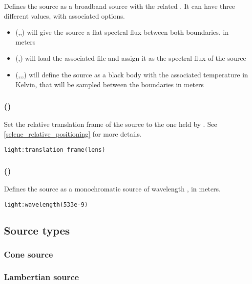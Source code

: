 Defines the source as a broadband source with the related . It can have three different values, with associated options.
\begin{itemize}
	\item {}(,,) will give the source a flat spectral flux between both boundaries, in meters
	\item {}(,) will load the associated file and assign it as the spectral flux of the source
	\item {}(,,,) will define the source as a black body with the associated temperature in Kelvin, that will be sampled between the boundaries in meters
\end{itemize}

\subsubsection[translation\_frame]{()}

Set the relative translation frame of the source to the one held by . See \ref{selene_relative_positioning} for more details.
\begin{lstlisting}
light:translation_frame(lens)
\end{lstlisting}

\subsubsection[wavelength]{()}

Defines the source as a monochromatic source of wavelength , in meters.
\begin{lstlisting}
light:wavelength(533e-9)
\end{lstlisting}

\subsection{Source types}

\subsubsection{Cone source}

\subsubsection{Lambertian source}

